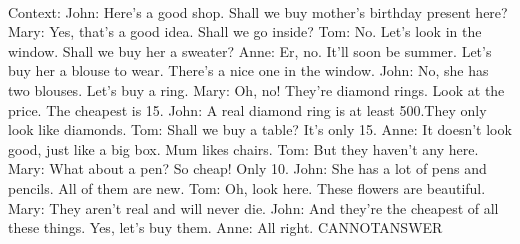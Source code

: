 \documentclass[11pt,a4paper, onecolumn]{article}
\begin{document}
\\ Context: John: Here's a good shop. Shall we buy mother's birthday present here? Mary: Yes, that's a good idea. Shall we go inside? Tom: No. Let's look in the window. Shall we buy her a sweater? Anne: Er, no. It'll soon be summer. Let's buy her a blouse to wear. There's a nice one in the window. John: No, she has two blouses. Let's buy a ring. Mary: Oh, no! They're diamond rings. Look at the price. The cheapest is  15. John: A real diamond ring is at least  500.They only look like diamonds. Tom: Shall we buy a table? It's only  15. Anne: It doesn't look good, just like a big box. Mum likes chairs. Tom: But they haven't any here. Mary: What about a pen? So cheap! Only  10. John: She has a lot of pens and pencils. All of them are new. Tom: Oh, look here. These flowers are beautiful. Mary: They aren't real and will never die. John: And they're the cheapest of all these things. Yes, let's buy them. Anne: All right. CANNOTANSWER
\end{document}
